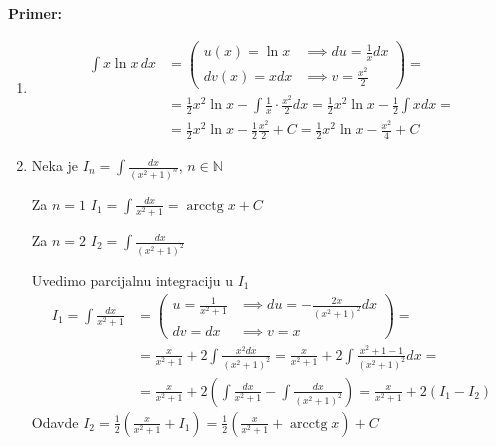 \documentclass[a4paper,12pt,twoside]{report}
\numberwithin{algorithm}{section}
\begin{document}
\noindent \textbf{Primer:}
\begin{enumerate}[label=\alph*)]
    \item \begin{align*}
        \int x \ln x \, dx &= \left( \begin{array}{ll}
            u(x) = \ln x & \implies du = \frac{1}{x}dx \\[1ex]
            dv(x) = x dx & \implies v = \frac{x^2}{2}
        \end{array} \right) = \\
        &= \frac{1}{2}x^2 \ln x - \int \frac{1}{x} \cdot \frac{x^2}{2} dx = \frac{1}{2}x^2 \ln x - \frac{1}{2} \int x dx = \\
        &= \frac{1}{2}x^2 \ln x - \frac{1}{2} \frac{x^2}{2} + C = \frac{1}{2}x^2 \ln x - \frac{x^2}{4} + C
    \end{align*}
    
    \item Neka je \(\displaystyle I_n = \int \frac{dx}{(x^2+1)^n}\), \(n \in \mathbb{N}\)
    
    Za \(n=1\) \quad \(\displaystyle I_1 = \int \frac{dx}{x^2+1} = \operatorname{arcctg} x + C\)
    
    Za \(n=2\) \quad \(\displaystyle I_2 = \int \frac{dx}{(x^2+1)^2}\)
    
    Uvedimo parcijalnu integraciju u \(I_1\)
    \begin{align*}
        I_1 = \int \frac{dx}{x^2+1} &= \left( \begin{array}{ll}
            u = \frac{1}{x^2+1} & \implies du = -\frac{2x}{(x^2+1)^2}dx \\[1ex]
            dv = dx & \implies v = x
        \end{array} \right) = \\
        &= \frac{x}{x^2+1} + 2 \int \frac{x^2 dx}{(x^2+1)^2} = \frac{x}{x^2+1} + 2 \int \frac{x^2+1-1}{(x^2+1)^2} dx = \\
        &= \frac{x}{x^2+1} + 2 \left( \int \frac{dx}{x^2+1} - \int \frac{dx}{(x^2+1)^2} \right) = \frac{x}{x^2+1} + 2(I_1 - I_2)
    \end{align*}
    Odavde \quad \(\displaystyle I_2 = \frac{1}{2} \left( \frac{x}{x^2+1} + I_1 \right) = \frac{1}{2} \left( \frac{x}{x^2+1} + \operatorname{arcctg} x \right) + C\)
    

\end{enumerate}
\end{document}
